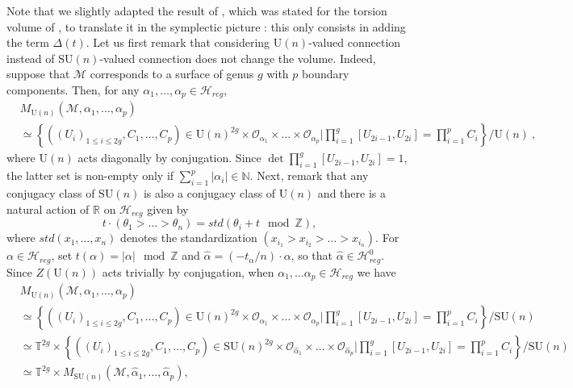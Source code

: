 \documentclass[11pt,a4paper]{amsart}
\providecommand{\U}{\mathrm U}
\providecommand{\SU}{\mathrm {SU}}
\numberwithin{equation}{section}
\theoremstyle{definition}
\begin{document}
\noindent
Note that we slightly adapted the result of \cite{Meinrenken_Woodward}, which was stated for the torsion volume of \cite{witten1992two}, 
to translate it in the symplectic picture : this only consists in adding the term $\Delta(t)$. 
Let us first remark that considering $\U(n)$-valued connection instead of $\SU(n)$-valued connection does not change the volume. 
Indeed, suppose that $\mathcal{M}$ corresponds to a surface of genus $g$ with $p$ boundary components. 
Then, for any $\alpha_1,\ldots,\alpha_{p}\in\mathcal{H}_{reg}$,
\begin{align*}
&M_{\U(n)}(\mathcal{M},\alpha_1,\ldots,\alpha_{p})\\
&\simeq \left\{\left((U_i)_{1\leqslant i\leqslant 2g},C_1,\ldots,C_{p}\right) \in \U(n)^{2g}\times\mathcal{O}_{\alpha_1}\times\dots\times 
\mathcal{O}_{\alpha_{p}}\Big\vert\prod_{i=1}^g[U_{2i-1},U_{2i}]=\prod_{i=1}^{p}C_i\right\}/ \U(n) \ ,
\end{align*} 
where $\U(n)$ acts diagonally by conjugation. 
Since $\det\prod_{i=1}^g[U_{2i-1},U_{2i}]=1$, the latter set is non-empty only if $\sum_{i=1}^p\vert \alpha_i\vert\in \mathbb{N}$. 
Next, remark that any conjugacy class of $\SU(n)$ is also a conjugacy class of $\U(n)$ and there is a natural action of $\mathbb{R}$ on $\mathcal{H}_{reg}$ given by 
$$t\cdot (\theta_1>\ldots >\theta_n)=std(\theta_i+t\mod \mathbb{Z}),$$
where $std(x_1,\ldots,x_n)$ denotes the standardization $(x_{i_1}>x_{i_2}>\ldots>x_{i_n})$. For $\alpha\in\mathcal{H}_{reg}$, set $t(\alpha)=\vert \alpha\vert\mod \mathbb{Z}$ 
and $\hat{\alpha}=(-t_{\alpha}/n)\cdot \alpha$, so that $\hat{\alpha}\in \mathcal{H}^0_{reg}$.
Since $Z(\U(n))$ acts trivially by conjugation, when $\alpha_{1},\ldots \alpha_{p}\in \mathcal{H}_{reg}$ we have
\begin{align*}
&M_{\U(n)}(\mathcal{M},\alpha_1,\ldots,\alpha_{p})\\
&\simeq \left\{((U_i)_{1\leqslant i\leqslant 2g},C_1,\ldots,C_{p})\in \U(n)^{2g}\times\mathcal{O}_{\alpha_1}\times\dots\times 
\mathcal{O}_{\alpha_{p}}\Big\vert\prod_{i=1}^g[U_{2i-1},U_{2i}]=\prod_{i=1}^{p}C_i\right\}/ \SU(n)\\
&\simeq \mathbb{T}^{2g}\times\left\{((U_i)_{1\leqslant i\leqslant 2g},C_1,\ldots,C_{p})\in \SU(n)^{2g}\times\mathcal{O}_{\hat{\alpha}_1}\times\dots\times 
\mathcal{O}_{\hat{\alpha}_{p}}\Big\vert\prod_{i=1}^g[U_{2i-1},U_{2i}]=\prod_{i=1}^{p}C_i\right\}/ \SU(n)\\
&\simeq \mathbb{T}^{2g}\times M_{\SU(n)}(\mathcal{M},\hat{\alpha}_1,\ldots,\hat{\alpha}_{p}),
\end{align*} 
\end{document}
